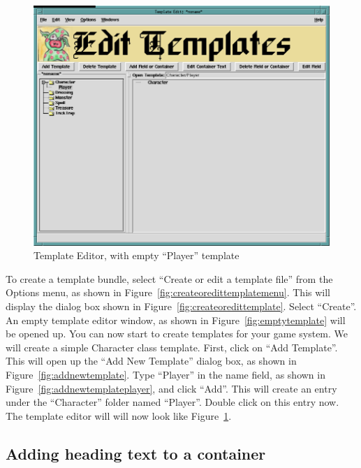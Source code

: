 \begin{figure}[hbpt]
\begin{centering}
\includegraphics[width=5in]{PlayerTemplateEditor.png}
\caption{Template Editor, with empty ``Player'' template}
\label{fig:emptyplayertemplateeditor}
\end{centering}
\end{figure}
To create a template bundle, select ``Create or edit a template file''
from the Options menu, as shown in
Figure~\ref{fig:createoredittemplatemenu}.  This will display the dialog box
shown in Figure~\ref{fig:createoredittemplate}.  Select ``Create''.  An
empty template editor window, as shown in Figure~\ref{fig:emptytemplate}
will be opened up.  You can now start to create templates for your game
system.  We will create a simple Character class template.  First, click
on ``Add Template''.  This will open up the ``Add New Template'' dialog
box, as shown in Figure~\ref{fig:addnewtemplate}.  Type ``Player'' in
the name field, as shown in Figure~\ref{fig:addnewtemplateplayer}, and
click ``Add''.  This will create an entry under the ``Character'' folder
named ``Player''.  Double click on this entry now.  The template editor
will will now look like Figure~\ref{fig:emptyplayertemplateeditor}.

\subsection{Adding heading text to a container}

